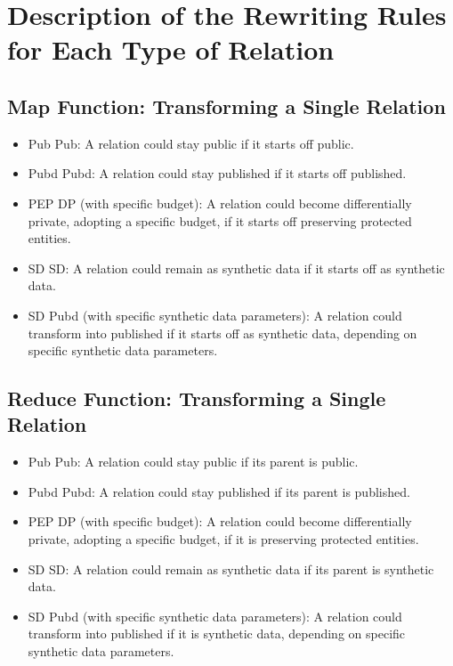 \documentclass[letterpaper]{article} %
\begin{document}
\section{Description of the Rewriting Rules for Each Type of Relation}

\subsection{Map Function: Transforming a Single Relation}
\begin{itemize}
    \item Pub \textrightarrow{} Pub: A relation could stay public if it starts off public.
    \item Pubd \textrightarrow{} Pubd: A relation could stay published if it starts off published.
    \item PEP \textrightarrow{} DP (with specific budget): A relation could become differentially private, adopting a specific budget, if it starts off preserving protected entities.
    \item SD \textrightarrow{} SD: A relation could remain as synthetic data if it starts off as synthetic data.
    \item SD \textrightarrow{} Pubd (with specific synthetic data parameters): A relation could transform into published if it starts off as synthetic data, depending on specific synthetic data parameters.
\end{itemize}

\subsection{Reduce Function: Transforming a Single Relation}
\begin{itemize}
    \item Pub \textrightarrow{} Pub: A relation could stay public if its parent is public.
    \item Pubd \textrightarrow{} Pubd: A relation could stay published if its parent is published.
    \item PEP \textrightarrow{} DP (with specific budget): A relation could become differentially private, adopting a specific budget, if it is preserving protected entities.
    \item SD \textrightarrow{} SD: A relation could remain as synthetic data if its parent is synthetic data.
    \item SD \textrightarrow{} Pubd (with specific synthetic data parameters): A relation could transform into published if it is synthetic data, depending on specific synthetic data parameters.
\end{itemize}
\end{document}
